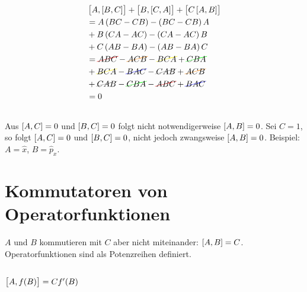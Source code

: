 \begin{align*}
    & \sbr{A,\sbr{B,C}} + \sbr{B,\sbr{C,A}} + \sbr{C\sbr{A,B}}\\
    &= A\del{BC-CB} - \del{BC-CB}A \\
    &+ B\del{CA-AC} - \del{CA-AC}B \\
    &+ C\del{AB-BA} - \del{AB-BA}C \\
    &= \ccancel[red]{ABC} - \ccancel[orange]{ACB} - \ccancel[yellow]{BCA} + \ccancel[green]{CBA} \\
    &+ \ccancel[yellow]{BCA} - \ccancel[blue]{BAC} - \ccancel[gray]{CAB} + \ccancel[orange]{ACB} \\
    &+ \ccancel[gray]{CAB} - \ccancel[green]{CBA} - \ccancel[red]{ABC} + \ccancel[blue]{BAC} \\
    &= 0
\end{align*}

\subsection{}

Aus $\sbr{A,C}=0$ und $\sbr{B,C}=0$ folgt nicht notwendigerweise $\sbr{A,B}=0$. 
Sei $C=1$, so folgt $\sbr{A,C}=0$ und $\sbr{B,C}=0$, nicht jedoch zwangsweise $\sbr{A,B}=0$. Beispiel: $A=\hat x$, $B=\hat p_x$.

\section{Kommutatoren von Operatorfunktionen}

$A$ und $B$ kommutieren mit $C$ aber nicht miteinander: $\sbr{A,B}=C$. Operatorfunktionen sind als Potenzreihen definiert.

\subsection{$\sbr{A,f(B)}=Cf'(B)$}

